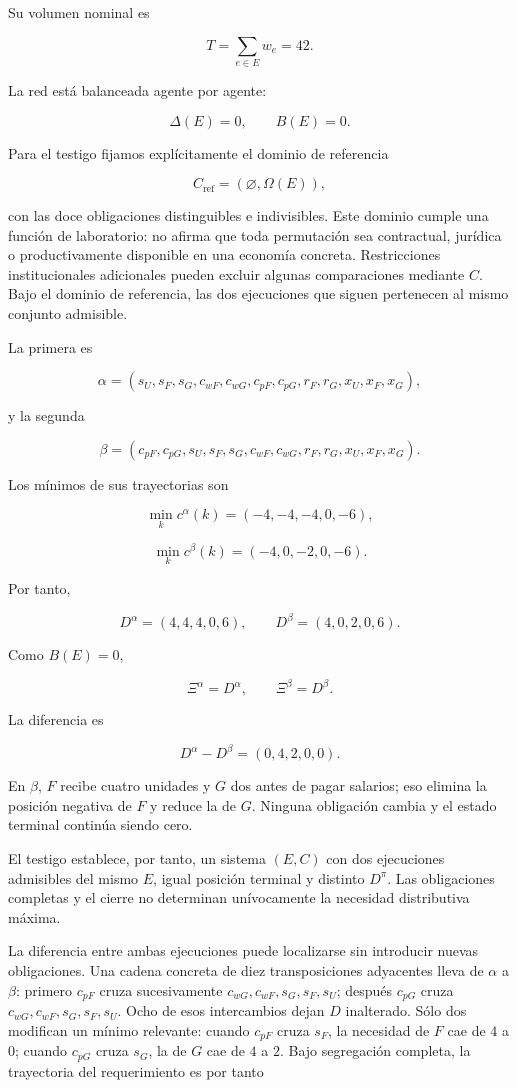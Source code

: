 \documentclass[10pt,a5paper,twoside]{article}
\begin{document}
Su volumen nominal es

\[
T=\sum_{e\in E}w_e=42.
\]

La red está balanceada agente por agente:

\[
\Delta(E)=0,
\qquad
B(E)=0.
\]

Para el testigo fijamos explícitamente el dominio de referencia

\[
C_{\mathrm{ref}}
=
(\varnothing,\Omega(E)),
\]

con las doce obligaciones distinguibles e indivisibles. Este dominio cumple una
función de laboratorio: no afirma que toda permutación sea contractual, jurídica o
productivamente disponible en una economía concreta. Restricciones institucionales
adicionales pueden excluir algunas comparaciones mediante \(C\). Bajo el dominio de
referencia, las dos ejecuciones que siguen pertenecen al mismo conjunto admisible.

La primera es

\[
\alpha
=
(s_U,s_F,s_G,c_{wF},c_{wG},c_{pF},c_{pG},r_F,r_G,x_U,x_F,x_G),
\]

y la segunda

\[
\beta
=
(c_{pF},c_{pG},s_U,s_F,s_G,c_{wF},c_{wG},r_F,r_G,x_U,x_F,x_G).
\]

Los mínimos de sus trayectorias son

\[
\min_k c^\alpha(k)
=
(-4,-4,-4,0,-6),
\]

\[
\min_k c^\beta(k)
=
(-4,0,-2,0,-6).
\]

Por tanto,

\[
D^\alpha=(4,4,4,0,6),
\qquad
D^\beta=(4,0,2,0,6).
\]

Como \(B(E)=0\),

\[
\Xi^\alpha=D^\alpha,
\qquad
\Xi^\beta=D^\beta.
\]

La diferencia es

\[
D^\alpha-D^\beta
=
(0,4,2,0,0).
\]

En \(\beta\), \(F\) recibe cuatro unidades y \(G\) dos antes de pagar
salarios; eso elimina la posición negativa de \(F\) y reduce la de
\(G\). Ninguna obligación cambia y el estado terminal continúa siendo
cero.

El testigo establece, por tanto, un sistema \((E,C)\) con dos ejecuciones
admisibles del mismo \(E\), igual posición terminal y distinto \(D^\pi\).
Las obligaciones completas y el cierre no determinan unívocamente la
necesidad distributiva máxima.

La diferencia entre ambas ejecuciones puede localizarse sin introducir
nuevas obligaciones. Una cadena concreta de diez transposiciones adyacentes
lleva de \(\alpha\) a \(\beta\): primero \(c_{pF}\) cruza sucesivamente
\(c_{wG},c_{wF},s_G,s_F,s_U\); después \(c_{pG}\) cruza
\(c_{wG},c_{wF},s_G,s_F,s_U\). Ocho de esos intercambios dejan \(D\)
inalterado. Sólo dos modifican un mínimo relevante: cuando \(c_{pF}\) cruza
\(s_F\), la necesidad de \(F\) cae de \(4\) a \(0\); cuando \(c_{pG}\)
cruza \(s_G\), la de \(G\) cae de \(4\) a \(2\). Bajo segregación completa,
la trayectoria del requerimiento es por tanto
\end{document}

